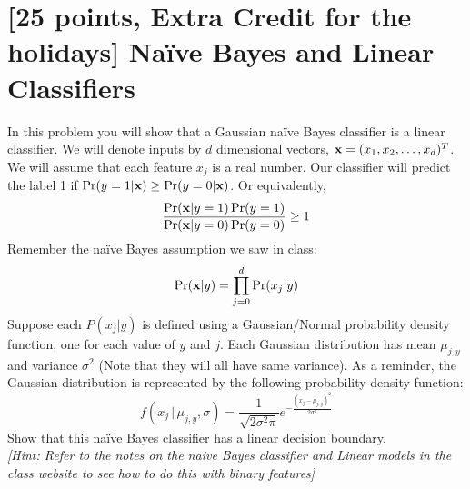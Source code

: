 \section{[25 points, Extra Credit for the holidays] Na\"ive Bayes and Linear Classifiers }
\label{sec:q1}


In this problem you will show that a Gaussian na\"ive Bayes classifier is a linear classifier. We will denote inputs by $d$ dimensional vectors, ${\bf x} = (x_1, x_2,\dots, x_d)^T$. We will assume that each feature $x_j$ is a real number. Our classifier will predict the label 1 if $\Pr(y=1|{\bf x}) \geq \Pr(y=0|{\bf x})$. Or equivalently,
\[
\frac{\Pr({\bf x} | y=1)\Pr(y=1)}{\Pr({\bf x} | y=0)\Pr(y=0)} \geq 1
\]
Remember the na\"ive Bayes assumption we saw in class:
\[
\Pr({\bf x}|y) = \prod_{j=0}^{d}\Pr(x_j|y)
\]
Suppose each $P(x_j|y)$ is defined using a Gaussian/Normal probability density function, one for each value of $y$ and $j$. Each Gaussian distribution has mean $\mu_{j,y}$ and variance $\sigma^2$ (Note that they will all have same variance). As a reminder, the Gaussian distribution is represented by the following probability density function:
\[
f(x_j\,|\,\mu_{j,y}, \sigma) = \frac{1}{\sqrt{2\sigma^2\pi}}e^{-\frac{(x_j-\mu_{j,y})^2}{2\sigma^2}}
\]
Show that this na\"ive Bayes classifier has a linear decision boundary.\\ \textit{[Hint: Refer to the notes on the naive Bayes classifier and Linear models in the class website to see how to do this with binary features]}


